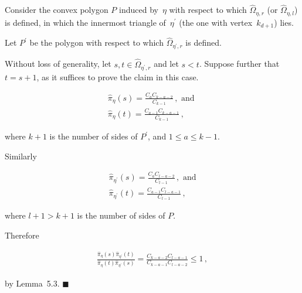 Consider the convex polygon $P$ induced by $\eta$ with respect to which $\hat{\Omega}_{\eta,r}$ (or $\hat{\Omega}_{\eta,l}$) is defined, in which the innermost triangle of $\eta^{\prime}$ (the one with vertex $k_{d+1}$) lies.\par




Let $P^{\prime}$ be the polygon with respect to which $\hat{\Omega}_{\eta^{\prime},r}$ is defined.\par




Without loss of generality, let $s,t\in\hat{\Omega}_{\eta^{\prime},r}$ and let $s<t$. Suppose further that $t=s+1$, as it suffices to prove the claim in this case.\par




\[\begin{gathered}
\displaystyle\hat{\pi}_{\eta}(s) \displaystyle=\frac{C_{a}C_{k-a-2}}{C_{k-1}}\,,\mbox{ and } \\
\displaystyle\hat{\pi}_{\eta}(t) \displaystyle=\frac{C_{a-1}C_{k-a-1}}{C_{k-1}}\,,
\end{gathered}\]


where $k+1$ is the number of sides of $P^{\prime}$, and $1\leq a\leq k-1$.\par




Similarly\par


\[\begin{gathered}
\displaystyle\hat{\pi}_{\eta^{\prime}}(s) \displaystyle=\frac{C_{a}C_{l-a-2}}{C_{l-1}}\,,\mbox{ and} \\
\displaystyle\hat{\pi}_{\eta^{\prime}}(t) \displaystyle=\frac{C_{a-1}C_{l-a-1}}{C_{l-1}}\,,
\end{gathered}\]


where $l+1>k+1$ is the number of sides of $P$.\par




Therefore\par


\[\begin{gathered}
\frac{\hat{\pi}_{\eta}(s)\hat{\pi}_{\eta^{\prime}}(t)}{\hat{\pi}_{\eta}(t)\hat{\pi}_{\eta^{\prime}}(s)}=\frac{C_{k-a-2}C_{l-a-1}}{C_{k-a-1}C_{l-a-2}}\leq 1\,,
\end{gathered}\]


by Lemma 5.3.
\ensuremath{\blacksquare}\par





